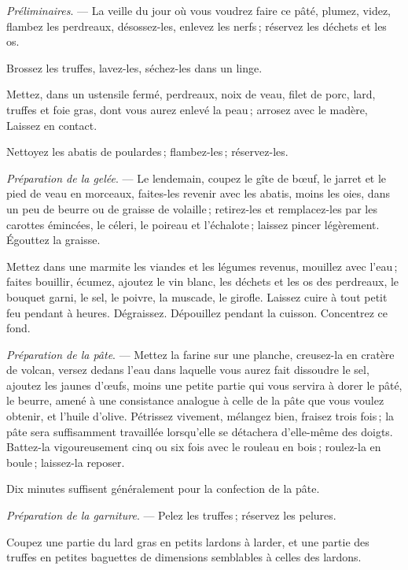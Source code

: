 \medskip

\textit{Préliminaires}. — La veille du jour où vous voudrez faire ce pâté,
plumez, videz, flambez les perdreaux, désossez-les, enlevez les nerfs ;
réservez les déchets et les os.

Brossez les truffes, lavez-les, séchez-les dans un linge.

Mettez, dans un ustensile fermé, perdreaux, noix de veau, filet de porc, lard,
truffes et foie gras, dont vous aurez enlevé la peau ; arrosez avec le madère,
Laissez en contact.

Nettoyez les abatis de poulardes ; flambez-les ; réservez-les.

\medskip

\textit{Préparation de la gelée}. — Le lendemain, coupez le gîte de bœuf, le
jarret et le pied de veau en morceaux, faites-les revenir avec les abatis,
moins les oies, dans un peu de beurre ou de graisse de volaille ; retirez-les
et remplacez-les par les carottes émincées, le céleri, le poireau et
l’échalote ; laissez pincer légèrement. Égouttez la graisse.

Mettez dans une marmite les viandes et les légumes revenus, mouillez avec
l'eau ; faites bouillir, écumez, ajoutez le vin blanc, les déchets et les os
des perdreaux, le bouquet garni, le sel, le poivre, la muscade, le girofle.
Laissez cuire à tout petit feu pendant {\mmm} à {\mmm} heures.
Dégraissez. Dépouillez pendant la cuisson. Concentrez ce fond.

\medskip

\textit{Préparation de la pâte}. — Mettez la farine sur une planche, creusez-la
en cratère de volcan, versez dedans l'eau dans laquelle vous aurez fait
dissoudre le sel, ajoutez les jaunes d'œufs, moins une petite partie qui vous
servira à dorer le pâté, le beurre, amené à une consistance analogue à celle de
la pâte que vous voulez obtenir, et l'huile d'olive. Pétrissez vivement,
mélangez bien, fraisez trois fois ; la pâte sera suffisamment travaillée
lorsqu'elle se détachera d'elle-même des doigts. Battez-la vigoureusement cinq
ou six fois avec le rouleau en bois ; roulez-la en boule ; laissez-la reposer.

Dix minutes suffisent généralement pour la confection de la pâte.

\medskip

\textit{Préparation de la garniture}. — Pelez les truffes ; réservez les
pelures.

Coupez une partie du lard gras en petits lardons à larder, et une partie des
truffes en petites baguettes de dimensions semblables à celles des lardons.


